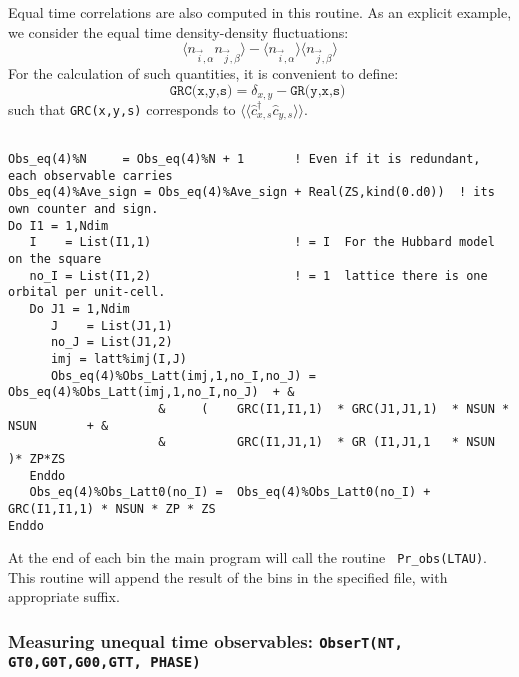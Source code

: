 Equal time correlations  are also computed in this routine. As an explicit example, we  consider the equal time density-density   fluctuations:
\begin{equation}
	 \langle n_{\vec{i},\alpha}   n_{\vec{j},\beta} \rangle   -  \langle n_{\vec{i},\alpha} \rangle  \langle    n_{\vec{j},\beta}  \rangle 
\end{equation} 
For the calculation of such quantities, it is convenient to  define: 
\begin{equation}
\label{GRC.eq}
	\texttt{GRC(x,y,s)}   =  \delta_{x,y}  - \texttt{GR(y,x,s)  }
\end{equation}
such that \texttt{GRC(x,y,s)}    corresponds to  $ \langle \langle  \hat{c}_{x,s}^{\dagger}\hat{c}_{y,s}^{\phantom\dagger} \rangle \rangle $.  
\begin{lstlisting} 

Obs_eq(4)%N     = Obs_eq(4)%N + 1       ! Even if it is redundant, each observable carries 
Obs_eq(4)%Ave_sign = Obs_eq(4)%Ave_sign + Real(ZS,kind(0.d0))  ! its own counter and sign.
Do I1 = 1,Ndim
   I    = List(I1,1)                    ! = I  For the Hubbard model  on the square
   no_I = List(I1,2)                    ! = 1  lattice there is one orbital per unit-cell. 
   Do J1 = 1,Ndim
      J    = List(J1,1)
      no_J = List(J1,2)
      imj = latt%imj(I,J)
      Obs_eq(4)%Obs_Latt(imj,1,no_I,no_J) =  Obs_eq(4)%Obs_Latt(imj,1,no_I,no_J)  + &
                     &     (    GRC(I1,I1,1)  * GRC(J1,J1,1)  * NSUN * NSUN       + &
                     &          GRC(I1,J1,1)  * GR (I1,J1,1   * NSUN              )* ZP*ZS  
   Enddo
   Obs_eq(4)%Obs_Latt0(no_I) =  Obs_eq(4)%Obs_Latt0(no_I) +   GRC(I1,I1,1) * NSUN * ZP * ZS
Enddo

\end{lstlisting} 
At the end of each bin  the main program will call the routine \texttt{ Pr\_obs(LTAU)}. This routine will append the result of the bins in the specified file,  with appropriate suffix. 


\subsubsection{Measuring  unequal time observables: \texttt{ObserT(NT,  GT0,G0T,G00,GTT, PHASE) }}


